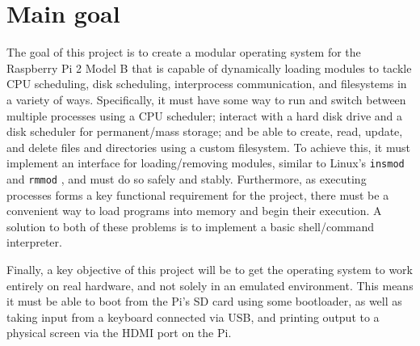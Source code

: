 \documentclass[10pt,a4paper]{article}
\newcommand{\code}[1]{\texttt{#1}}
\begin{document}
\section*{Main goal}
The goal of this project is to create a modular operating system for the
Raspberry Pi 2 Model B that is capable of dynamically loading modules to tackle
CPU scheduling, disk scheduling, interprocess communication, and filesystems in
a variety of ways. Specifically, it must have some way to run and switch
between multiple processes using a CPU scheduler; interact with a hard disk
drive and a disk scheduler for permanent/mass storage; and be able to create,
read, update, and delete files and directories using a custom filesystem.  To
achieve this, it must implement an interface for loading/removing modules,
similar to Linux's \code{insmod} and \code{rmmod} \cite{insmod}, and must do so
safely and stably.  Furthermore, as executing processes forms a key functional
requirement for the project, there must be a convenient way to load programs
into memory and begin their execution. A solution to both of these problems is
to implement a basic shell/command interpreter.

Finally, a key objective of this project will be to get the operating system to
work entirely on real hardware, and not solely in an emulated environment. This
means it must be able to boot from the Pi's SD card using some bootloader, as
well as taking input from a keyboard connected via USB, and printing output to
a physical screen via the HDMI port on the Pi.
\end{document}
